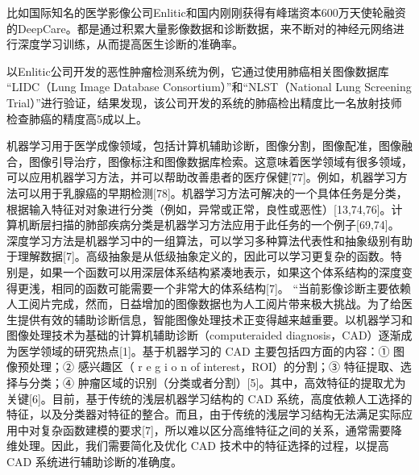 比如国际知名的医学影像公司Enlitic和国内刚刚获得有峰瑞资本600万天使轮融资的DeepCare。都是通过积累大量影像数据和诊断数据，来不断对的神经元网络进行深度学习训练，从而提高医生诊断的准确率。

以Enlitic公司开发的恶性肿瘤检测系统为例，它通过使用肺癌相关图像数据库 “LIDC（Lung Image Database Consortium）”和“NLST（National Lung Screening Trial）”进行验证，结果发现，该公司开发的系统的肺癌检出精度比一名放射技师检查肺癌的精度高5成以上。

机器学习用于医学成像领域，包括计算机辅助诊断，图像分割，图像配准，图像融合，图像引导治疗，图像标注和图像数据库检索。这意味着医学领域有很多领域，可以应用机器学习方法，并可以帮助改善患者的医疗保健[77]。例如，机器学习方法可以用于乳腺癌的早期检测[78]。机器学习方法可解决的一个具体任务是分类，根据输入特征对对象进行分类（例如，异常或正常，良性或恶性）[13,74,76]。计算机断层扫描的肺部疾病分类是机器学习方法应用于此任务的一个例子[69,74]。
深度学习方法是机器学习中的一组算法，可以学习多种算法代表性和抽象级别有助于理解数据[7]。高级抽象是从低级抽象定义的，因此可以学习更复杂的函数。特别是，如果一个函数可以用深层体系结构紧凑地表示，如果这个体系结构的深度变得更浅，相同的函数可能需要一个非常大的体系结构[7]。
“当前影像诊断主要依赖人工阅片完成，然而，日益增加的图像数据也为人工阅片带来极大挑战。为了给医生提供有效的辅助诊断信息，智能图像处理技术正变得越来越重要。以机器学习和图像处理技术为基础的计算机辅助诊断（computeraided diagnosis，CAD）逐渐成为医学领域的研究热点[1]。基于机器学习的 CAD 主要包括四方面的内容：① 图像预处理；② 感兴趣区（ r e g i o n of interest，ROI）的分割；③ 特征提取、选择与分类；④ 肿瘤区域的识别（分类或者分割）[5]。其中，高效特征的提取尤为关键[6]。目前，基于传统的浅层机器学习结构的 CAD 系统，高度依赖人工选择的特征，以及分类器对特征的整合。而且，由于传统的浅层学习结构无法满足实际应用中对复杂函数建模的要求[7]，所以难以区分高维特征之间的关系，通常需要降维处理。因此，我们需要简化及优化 CAD 技术中的特征选择的过程，以提高 CAD 系统进行辅助诊断的准确度。 


